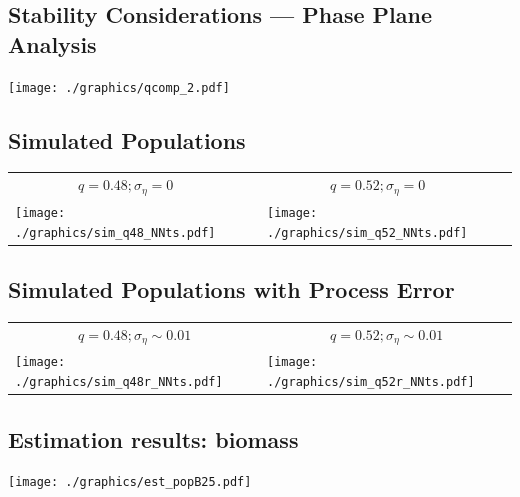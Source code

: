 \documentclass[a4paper,KOMA,landscape,titlepage]{powersem}
\begin{document}
\begin{slide}\section{Stability Considerations --- Phase Plane Analysis}
\begin{center}
\texttt{[image: ./graphics/qcomp\_2.pdf]}
\end{center}
\end{slide}

\begin{slide}\section{Simulated Populations}
\begin{center}
\begin{tabular}{ll}
~~~~~~~~~$q=0.48; \sigma_\eta=0$ &~~~~~~~~~$q=0.52; \sigma_\eta=0$\\
\texttt{[image: ./graphics/sim\_q48\_NNts.pdf]}&
\texttt{[image: ./graphics/sim\_q52\_NNts.pdf]}\\
\end{tabular}
\end{center}
\end{slide}

\begin{slide}\section{Simulated Populations with Process Error}
\begin{center}
\begin{tabular}{ll}
~~~~~~~~~$q=0.48; \sigma_\eta\sim 0.01$ &~~~~~~~~~$q=0.52;
\sigma_\eta\sim 0.01$\\
\texttt{[image: ./graphics/sim\_q48r\_NNts.pdf]}&
\texttt{[image: ./graphics/sim\_q52r\_NNts.pdf]}\\
\end{tabular}
\end{center}
\end{slide}

\begin{slide}\section{Estimation results: biomass}
\begin{center}
\texttt{[image: ./graphics/est\_popB25.pdf]}
\end{center}
\end{slide}
\end{document}
